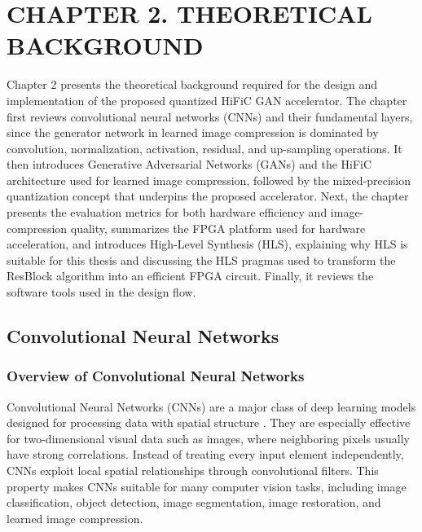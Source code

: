 \newpage
\section*{CHAPTER 2. THEORETICAL BACKGROUND}
\setcounter{section}{2}
\setcounter{subsection}{0}
\setcounter{subsubsection}{0}
\setcounter{figure}{0}
\setcounter{table}{0}

Chapter 2 presents the theoretical background required for the design and implementation of the proposed quantized HiFiC GAN accelerator. The chapter first reviews convolutional neural networks (CNNs) and their fundamental layers, since the generator network in learned image compression is dominated by convolution, normalization, activation, residual, and up-sampling operations. It then introduces Generative Adversarial Networks (GANs) and the HiFiC architecture used for learned image compression, followed by the mixed-precision quantization concept that underpins the proposed accelerator. Next, the chapter presents the evaluation metrics for both hardware efficiency and image-compression quality, summarizes the FPGA platform used for hardware acceleration, and introduces High-Level Synthesis (HLS), explaining why HLS is suitable for this thesis and discussing the HLS pragmas used to transform the ResBlock algorithm into an efficient FPGA circuit. Finally, it reviews the software tools used in the design flow.

\subsection{Convolutional Neural Networks}

\subsubsection{Overview of Convolutional Neural Networks}

Convolutional Neural Networks (CNNs) are a major class of deep learning models designed for processing data with spatial structure \cite{ajit2020review}. They are especially effective for two-dimensional visual data such as images, where neighboring pixels usually have strong correlations. Instead of treating every input element independently, CNNs exploit local spatial relationships through convolutional filters. This property makes CNNs suitable for many computer vision tasks, including image classification, object detection, image segmentation, image restoration, and learned image compression.

